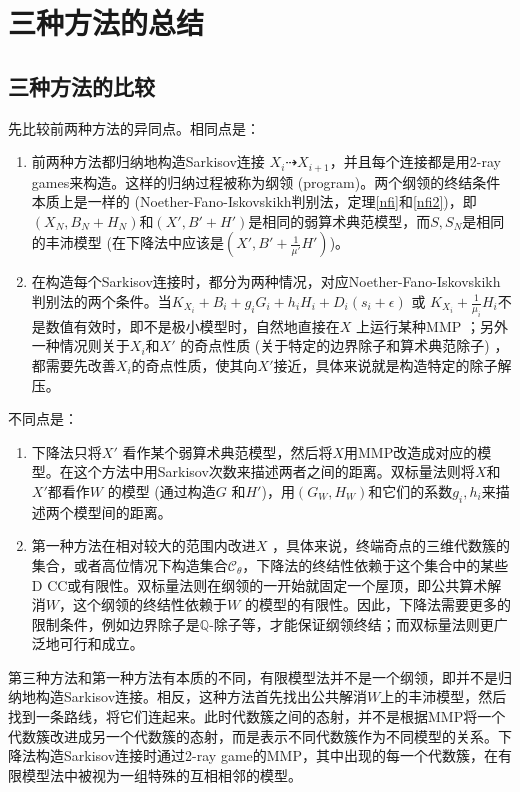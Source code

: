 \chapter{三种方法的总结}

\section{三种方法的比较}
先比较前两种方法的异同点。相同点是：
\begin{enumerate}
  \item 前两种方法都归纳地构造Sarkisov连接 $X_{i} \dashrightarrow X_{i+1}$，并且每个连接都是用2-ray games来构造。这样的归纳过程被称为纲领 (program)。两个纲领的终结条件本质上是一样的 (Noether-Fano-Iskovskikh判别法，定理\ref{nfi}和\ref{nfi2})，即$(X_{N}, B_{N}+H_{N})$和$(X',B'+H')$是相同的弱算术典范模型，而$S,S_{N}$是相同的丰沛模型 (在下降法中应该是$(X',B'+ \frac{1}{\mu'}H')$)。
  \item 在构造每个Sarkisov连接时，都分为两种情况，对应Noether-Fano-Iskovskikh判别法的两个条件。当$K_{X_{i}}+B_{i}+g_{i}G_{i}+h_{i}H_{i}+D_{i}(s_{i}+\epsilon)$ 或 $K_{X_{i}}+ \frac{1}{\mu_{i}}H_{i}$不是数值有效时，即不是极小模型时，自然地直接在$X$ 上运行某种MMP ；另外一种情况则关于$X_{i}$和$X'$ 的奇点性质 (关于特定的边界除子和算术典范除子) ，都需要先改善$X_{i}$的奇点性质，使其向$X'$接近，具体来说就是构造特定的除子解压。 
\end{enumerate}
不同点是：
\begin{enumerate}
  \item 下降法只将$X'$ 看作某个弱算术典范模型，然后将$X$用MMP改造成对应的模型。在这个方法中用Sarkisov次数来描述两者之间的距离。双标量法则将$X$和$X'$都看作$W$ 的模型 (通过构造$G$ 和$H'$)，用$(G_{W},H_{W})$和它们的系数$g_{i},h_{i}$来描述两个模型间的距离。
  \item 第一种方法在相对较大的范围内改进$X$ ，具体来说，终端奇点的三维代数簇的集合，或者高位情况下构造集合$\mathcal{C}_{\theta}$，下降法的终结性依赖于这个集合中的某些D CC或有限性。双标量法则在纲领的一开始就固定一个屋顶，即公共算术解消$W$，这个纲领的终结性依赖于$W$ 的模型的有限性。因此，下降法需要更多的限制条件，例如边界除子是$\mathbb{Q}$-除子等，才能保证纲领终结；而双标量法则更广泛地可行和成立。  
\end{enumerate}

第三种方法和第一种方法有本质的不同，有限模型法并不是一个纲领，即并不是归纳地构造Sarkisov连接。相反，这种方法首先找出公共解消$W$上的丰沛模型，然后找到一条路线，将它们连起来。此时代数簇之间的态射，并不是根据MMP将一个代数簇改进成另一个代数簇的态射，而是表示不同代数簇作为不同模型的关系。下降法构造Sarkisov连接时通过2-ray game的MMP，其中出现的每一个代数簇，在有限模型法中被视为一组特殊的互相相邻的模型。
